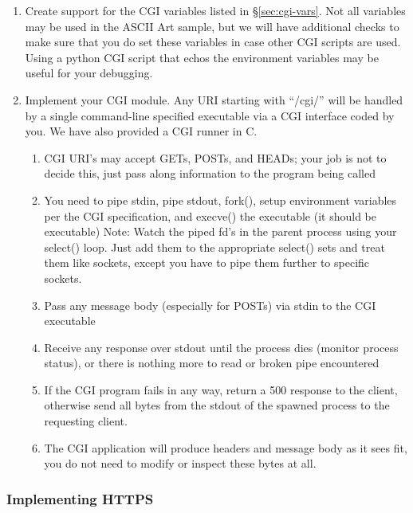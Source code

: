 \begin{enumerate}
  
  \item Create support for the CGI variables listed in \S\ref{sec:cgi-vars}. Not all variables may be used in the ASCII Art sample, but we will have additional checks to make sure that you do set these variables in case other CGI scripts are used. Using a python CGI script that echos the environment variables may be useful for your debugging.
\item Implement your CGI module. Any URI starting with ``/cgi/'' will be handled by a single command-line specified executable via a CGI interface coded by you. We have also provided a CGI runner in C. 
\begin{enumerate}
    \item CGI URI's may accept GETs, POSTs, and HEADs; your job is not to decide this, just pass along information to the program being called
    \item You need to pipe stdin, pipe stdout, fork(), setup environment variables per the CGI specification, and execve() the executable (it should be executable) Note: Watch the piped fd's in the parent process using your select() loop. Just add them to the appropriate select() sets and treat them like sockets, except you have to pipe them further to specific sockets.
    \item Pass any message body (especially for POSTs) via stdin to the CGI executable
    \item Receive any response over stdout until the process dies (monitor process status), or there is nothing more to read or broken pipe encountered
    \item If the CGI program fails in any way, return a 500 response to the client, otherwise send all bytes from the stdout of the spawned process to the requesting client.
    \item The CGI application will produce headers and message body as it sees fit, you do not need to modify or inspect these bytes at all.
\end{enumerate}
\end{enumerate}

\subsubsection{Implementing HTTPS}


